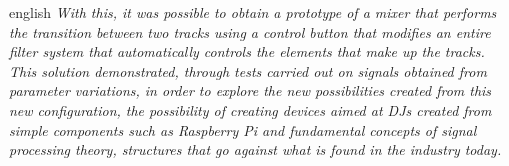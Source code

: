 \begin{resumo}[Abstract]
\begin{otherlanguage*}{english}
\textit{With this, it was possible to obtain a prototype of a mixer that performs the transition between two tracks using a control button that modifies an entire filter system that automatically controls the elements that make up the tracks. This solution demonstrated, through tests carried out on signals obtained from parameter variations, in order to explore the new possibilities created from this new configuration, the possibility of creating devices aimed at DJs created from simple components such as Raspberry Pi and fundamental concepts of signal processing theory, structures that go against what is found in the industry today.}

\end{otherlanguage*}
\end{resumo}
